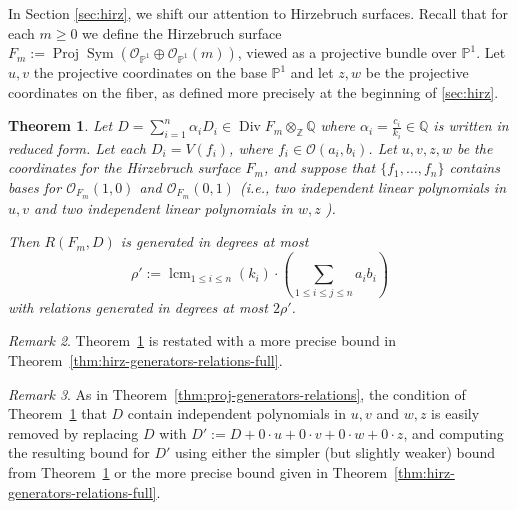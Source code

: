 \documentclass{amsart}
\theoremstyle{plain}
\newtheorem{thm}{Theorem}[subsection]
\theoremstyle{definition}
\theoremstyle{remark}
\newtheorem{rem}[thm]{Remark}
\numberwithin{equation}{section}
\newcommand\bq{{\mathbb Q}}
\newcommand\bp{{\mathbb P}}
\newcommand\bz{{\mathbb Z}}
\newcommand\sco{{\mathscr O}}
\DeclareMathOperator{\sym}{Sym}
\DeclareMathOperator\di{Div}
\newcommand\bida{a}
\newcommand\bidb{b}
\newcommand\hirz{F}
\DeclareMathOperator{\proj}{Proj}
\DeclareMathOperator{\lcm}{lcm}
\begin{document}
In Section \ref{sec:hirz}, we shift our attention to Hirzebruch surfaces. Recall that for each $m \geq 0$ we define the
Hirzebruch surface $F_m := \proj \sym (\sco_{\bp^1} \oplus
\sco_{\bp^1}(m))$, viewed as a projective bundle over $\bp^1$.
Let $u,v$ the projective coordinates on the base $\bp^1$ and let $z,w$ be the projective coordinates
on the fiber, as defined more precisely at the beginning of
\ref{sec:hirz}.

\begin{thm}
\label{thm:hirz-generators-relations}
Let $D = \sum_{i = 1}^n \alpha_i D_i \in \di \hirz_m \otimes_\bz \bq$ where $\alpha_i = \frac{c_i}{k_i} \in \bq$ is written in reduced form.  
Let each $D_i = V(f_i)$, where $f_i \in \sco(a_i, b_i)$.
Let $u, v, z, w$ be the coordinates for the Hirzebruch surface
$\hirz_m$, and suppose that $\{f_1, \ldots, f_n\}$
contains bases for $\sco_{F_m}(1,0)$ and $\sco_{F_m}(0,1)$
{\rm(}i.e., two independent linear polynomials in $u, v$ and two independent linear polynomials in
$w, z$ {\rm)}.

Then $R(\hirz_m, D)$ is generated in degrees at most
\[
	\rho' := \lcm_{1\le i\le n}(k_i)\cdot \left(\sum_{1\le i\le j\le n} \bida_i \bidb_i\right) 
\]
\noindent
with relations generated in degrees at most 
$2 \rho'$.
\end{thm}

\begin{rem}
Theorem~\ref{thm:hirz-generators-relations} is restated with a more
precise bound in Theorem~\ref{thm:hirz-generators-relations-full}.
\end{rem}

\begin{rem}
	\label{rem:hirz-generators-relations-hypothesis}
	As in Theorem~\ref{thm:proj-generators-relations}, the condition
	of Theorem~\ref{thm:hirz-generators-relations} that $D$ contain
	independent polynomials in $u, v$ and $w, z$ is
	easily removed by replacing $D$ with $D' :=D +0 \cdot u + 0 \cdot
	v + 0 \cdot w + 0 \cdot z$,	and computing the resulting bound for
	$D'$ using either the simpler (but slightly weaker) bound
	from Theorem~\ref{thm:hirz-generators-relations} or the more
	precise bound given in Theorem~\ref{thm:hirz-generators-relations-full}.
\end{rem}
\end{document}
